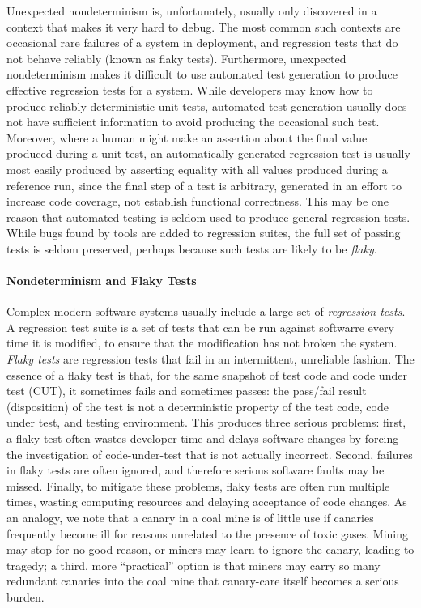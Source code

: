 
Unexpected nondeterminism is, unfortunately, usually only discovered
in a context that makes it very hard to debug.   The most common such
contexts are occasional rare failures of a system in deployment, and
regression tests that do not behave reliably (known as flaky tests).
Furthermore, unexpected nondeterminism makes it difficult to use
automated test generation to produce effective regression tests for a
system.  While developers may know how to produce reliably
deterministic unit tests, automated test generation usually does not have sufficient information to avoid
producing the occasional such test.  Moreover, where a human might
make an assertion about the final value produced during a unit test,
an automatically generated regression test is usually most easily produced by
asserting equality with all values produced during a reference
run, since the final step of a test
is arbitrary, generated in an effort to increase
code coverage, not establish functional correctness.
This may be one reason that automated testing is seldom used to
produce general regression tests.  While bugs found by tools are added
to regression suites, the full
set of passing tests is seldom preserved, perhaps because such tests are
likely to be \emph{flaky}.

\paragraph{Nondeterminism and Flaky Tests}

Complex
modern software systems usually include a large set of
\emph{regression tests}.  A regression test suite is a
set of tests that can be run against softwarre every time it
is modified, to ensure that the modification has not broken the system.  \emph{Flaky tests} \cite{miccoflaky} are regression
tests that fail in an intermittent, unreliable fashion.  The essence of a flaky
test is that, for the same snapshot of test code and code under test
(CUT), it sometimes fails and sometimes passes: the pass/fail result (disposition) of the
test is not a deterministic property of the test code, code under
test, and testing environment.  This produces three serious
problems: first, a flaky test often wastes developer time and delays
software changes by forcing the investigation of code-under-test that
is not actually incorrect.  Second, failures in flaky tests are often ignored, and therefore serious software faults may
be missed.  Finally, to mitigate these problems, flaky tests are often
run multiple times, wasting computing resources and
delaying acceptance of code changes.  As an analogy, we note that  a canary in a coal mine is of
little use if canaries frequently become ill for reasons unrelated to
the presence of toxic gases.  Mining may stop for no good reason, or
miners may learn to ignore the canary, leading to tragedy; a third,
more ``practical'' option is that miners may carry so many redundant
canaries into the coal mine that canary-care itself becomes a serious burden.

